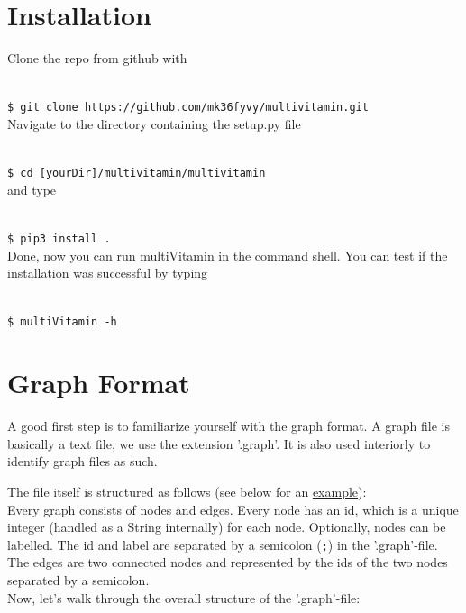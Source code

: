 \documentclass{SeminarV2}
\newcommand{\shellcmd}[1]{\\\indent\indent\texttt{\footnotesize\$ #1}\\}
\newcommand{\mV}{multiVitamin }
\begin{document}
\section{Installation}

Clone the repo from github with 

\shellcmd{git clone https://github.com/mk36fyvy/multivitamin.git}

Navigate to the directory containing the setup.py file 

\shellcmd{cd [yourDir]/multivitamin/multivitamin}

and type

\shellcmd{pip3 install .}

Done, now you can run \mV in the command shell. You can test if the installation was successful by typing

\shellcmd{multiVitamin -h}



\section{Graph Format}

A good first step is to familiarize yourself with the graph format. A graph file is basically a text file, we use the extension '.graph'. It is also used interiorly to identify graph files as such.

The file itself is structured as follows (see below for an \hyperref[fig:graph_example]{example}): \\

Every graph consists of nodes and edges. Every node has an id, which is a unique integer (handled as a String internally) for each node. Optionally, nodes can be labelled. The id and label are separated by a semicolon (\texttt{;}) in the '.graph'-file. The edges are two connected nodes and represented by the ids of the two nodes separated by a semicolon.\\

Now, let's walk through the overall structure of the '.graph'-file: 
\end{document}
